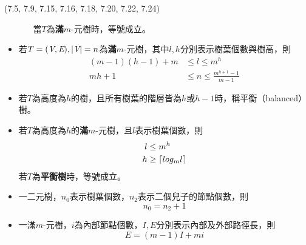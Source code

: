 \begin{theorem}{(7.5, 7.9, 7.15, 7.16, 7.18, 7.20, 7.22, 7.24)}
\begin{itemize}
\begin{itemize}
            當$T$為\textbf{滿}$m$-元樹時，等號成立。
        \end{itemize}
        \item 若$T = (\textit{V}, \textit{E}), |\textit{V}| = n$為\textbf{滿}$m$-元樹，其中$l, h$分別表示樹葉個數與樹高，則\begin{equation}
            \begin{aligned}
                (m - 1)(h - 1) + m & \le l \le m^h \\
                mh+ 1 & \le n \le \frac{m^{h + 1} - 1}{m - 1}
            \end{aligned}
        \end{equation}
        \item 若$T$為高度為$h$的樹，且所有樹葉的階層皆為$h$或$h - 1$時，稱平衡（balanced）樹。
        \item 若$T$為高度為$h$的\textbf{滿}$m$-元樹，且$l$表示樹葉個數，則\begin{equation}
            \begin{aligned}
                l & \le m^h \\
                h & \ge \lceil log_{m}l\rceil
            \end{aligned}
        \end{equation} 若$T$為\textbf{平衡樹}時，等號成立。
        \item 一二元樹，$n_0$表示樹葉個數，$n_2$表示二個兒子的節點個數，則\begin{equation}
            n_0 = n_2 + 1
        \end{equation}
        \item 一滿$m$-元樹，$i$為內部節點個數，$I, E$分別表示內部及外部路徑長，則\begin{equation}
            E = (m - 1)I + mi
        \end{equation}
    \end{itemize}
\end{theorem}

